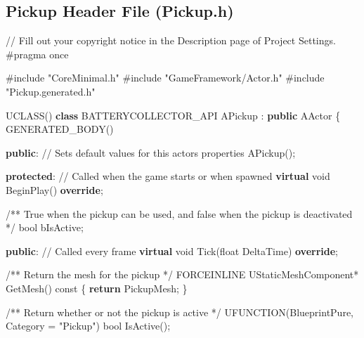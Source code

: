 \documentclass[
  letterpaper,
  DIV=11,
  numbers=noendperiod]{scrartcl}
\newenvironment{Shaded}{\begin{snugshade}}{\end{snugshade}}
\newcommand{\AttributeTok}[1]{\textcolor[rgb]{0.40,0.45,0.13}{#1}}
\newcommand{\CommentTok}[1]{\textcolor[rgb]{0.37,0.37,0.37}{#1}}
\newcommand{\ControlFlowTok}[1]{\textcolor[rgb]{0.00,0.23,0.31}{\textbf{#1}}}
\newcommand{\DataTypeTok}[1]{\textcolor[rgb]{0.68,0.00,0.00}{#1}}
\newcommand{\ImportTok}[1]{\textcolor[rgb]{0.00,0.46,0.62}{#1}}
\newcommand{\KeywordTok}[1]{\textcolor[rgb]{0.00,0.23,0.31}{\textbf{#1}}}
\newcommand{\NormalTok}[1]{\textcolor[rgb]{0.00,0.23,0.31}{#1}}
\newcommand{\OperatorTok}[1]{\textcolor[rgb]{0.37,0.37,0.37}{#1}}
\newcommand{\PreprocessorTok}[1]{\textcolor[rgb]{0.68,0.00,0.00}{#1}}
\newcommand{\StringTok}[1]{\textcolor[rgb]{0.13,0.47,0.30}{#1}}
\begin{document}
\subsection{Pickup Header File
(Pickup.h)}\label{pickup-header-file-pickup.h}

\begin{Shaded}
\begin{Highlighting}[]
\CommentTok{// Fill out your copyright notice in the Description page of Project Settings.}
\PreprocessorTok{\#pragma once}

\PreprocessorTok{\#include }\ImportTok{"CoreMinimal.h"}
\PreprocessorTok{\#include }\ImportTok{"GameFramework/Actor.h"}
\PreprocessorTok{\#include }\ImportTok{"Pickup.generated.h"}

\NormalTok{UCLASS}\OperatorTok{()}
\KeywordTok{class}\NormalTok{ BATTERYCOLLECTOR\_API APickup }\OperatorTok{:} \KeywordTok{public}\NormalTok{ AActor}
\OperatorTok{\{}
\NormalTok{    GENERATED\_BODY}\OperatorTok{()}
    
\KeywordTok{public}\OperatorTok{:}    
    \CommentTok{// Sets default values for this actor\textquotesingle{}s properties}
\NormalTok{    APickup}\OperatorTok{();}

\KeywordTok{protected}\OperatorTok{:}
    \CommentTok{// Called when the game starts or when spawned}
    \KeywordTok{virtual} \DataTypeTok{void}\NormalTok{ BeginPlay}\OperatorTok{()} \KeywordTok{override}\OperatorTok{;}
    
    \CommentTok{/** True when the pickup can be used, and false when the pickup is deactivated */}
    \DataTypeTok{bool}\NormalTok{ bIsActive}\OperatorTok{;}

\KeywordTok{public}\OperatorTok{:}    
    \CommentTok{// Called every frame}
    \KeywordTok{virtual} \DataTypeTok{void}\NormalTok{ Tick}\OperatorTok{(}\DataTypeTok{float}\NormalTok{ DeltaTime}\OperatorTok{)} \KeywordTok{override}\OperatorTok{;}
    
    \CommentTok{/** Return the mesh for the pickup */}
\NormalTok{    FORCEINLINE UStaticMeshComponent}\OperatorTok{*}\NormalTok{ GetMesh}\OperatorTok{()} \AttributeTok{const} \OperatorTok{\{} \ControlFlowTok{return}\NormalTok{ PickupMesh}\OperatorTok{;} \OperatorTok{\}}
    
    \CommentTok{/** Return whether or not the pickup is active */}
\NormalTok{    UFUNCTION}\OperatorTok{(}\NormalTok{BlueprintPure}\OperatorTok{,}\NormalTok{ Category }\OperatorTok{=} \StringTok{"Pickup"}\OperatorTok{)}
    \DataTypeTok{bool}\NormalTok{ IsActive}\OperatorTok{();}
    

\end{Highlighting}
\end{Shaded}
\end{document}
